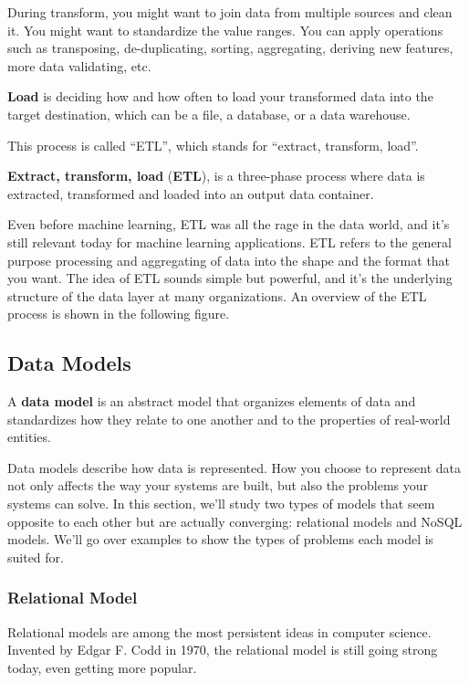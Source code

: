 During transform, you might want to join data from multiple sources and clean it. You might want to standardize the
value ranges. You can apply operations such as transposing, de-duplicating, sorting, aggregating, deriving new
features, more data validating, etc.

\bd[Load]
\textbf{Load} is deciding how and how often to load your transformed data into the target destination, which can be a
file, a database, or a data warehouse.
\ed

This process is called ``ETL'', which stands for ``extract, transform, load''.

\textbf{Extract, transform, load} (\textbf{ETL}), is a three-phase process where data is extracted, transformed and
loaded into an output data container.
\ed

Even before machine learning, ETL was all the rage in the data world, and it's still relevant today for machine
learning applications. ETL refers to the general purpose processing and aggregating of data into the shape and the
format that you want. The idea of ETL sounds simple but powerful, and it's the underlying structure of the data layer
at many organizations. An overview of the ETL process is shown in the following figure.


\subsection{Data Models}

A \textbf{data model} is an abstract model that organizes elements of data and standardizes how they relate to one
another and to the properties of real-world entities.
\ed

Data models describe how data is represented. How you choose to represent data not only affects the way your systems 
are built, but also the problems your systems can solve. In this section, we'll study two types of models that seem 
opposite to each other but are actually converging: relational models and NoSQL models. We'll go over examples to 
show the types of problems each model is suited for.

\subsubsection{Relational Model}

Relational models are among the most persistent ideas in computer science. Invented by Edgar F. Codd in 1970, the
relational model is still going strong today, even getting more popular.


